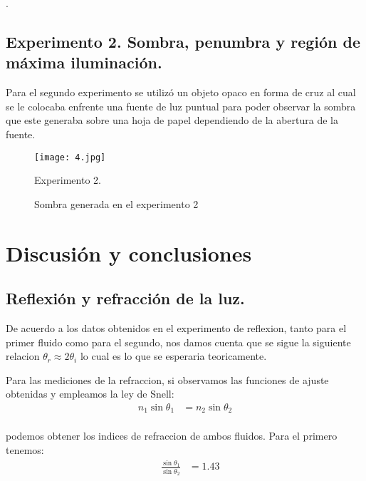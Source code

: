 \documentclass[10pt,journal]{IEEEtran}
\begin{document}
.

\subsection{Experimento 2. Sombra, penumbra y región de máxima iluminación.}
Para el segundo experimento se utilizó un objeto opaco en forma de cruz al cual se le colocaba enfrente una fuente de luz puntual para poder observar la sombra que este generaba sobre una hoja de papel dependiendo de la abertura de la fuente.



\begin{figure}[!ht]
\begin {center}
\texttt{[image: 4.jpg]}
\caption{Experimento 2.}
\end {center}
\end{figure}


\begin{figure}[!ht]
  \centering
  \caption{Sombra generada en el experimento 2}
  \label{fig:myimage}
\end{figure}

\section{Discusión y conclusiones}

\subsection{Reflexión y refracción de la luz.}
\item 

De acuerdo a los datos obtenidos en el experimento de reflexion, tanto para el primer fluido como para el segundo, nos damos cuenta que se sigue la siguiente relacion $\theta_r \approx 2\theta_i$ lo cual es lo que se esperaria teoricamente. 

Para las mediciones de la refraccion, si observamos las funciones de ajuste obtenidas y empleamos la ley de Snell:
\begin{align*}
    n_1\sin\theta_1 &= n_2\sin\theta_2 \\
\end{align*}

podemos obtener los indices de refraccion de ambos fluidos. Para el primero tenemos:
\begin{align*}
\quad \frac{\sin\theta_1}{\sin\theta_2} &= 1.43
\end{align*}
\end{document}
